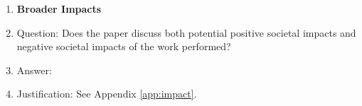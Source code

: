 \begin{enumerate}
\item {\bf Broader Impacts}
    \item[] Question: Does the paper discuss both potential positive societal impacts and negative societal impacts of the work performed?
    \item[] Answer: \answerYes{} %
    \item[] Justification: See Appendix \ref{app:impact}.
    

\end{enumerate}
